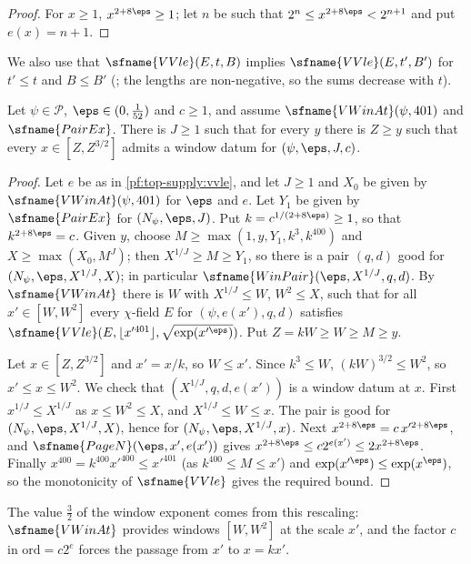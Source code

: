\begin{proof}
For $x\ge1$, $x^{2+8\eps}\ge1$; let $n$ be such that $2^n\le x^{2+8\eps}<2^{n+1}$ and put $e(x)=n+1$.
\end{proof}

We also use that $\sfname{VVle}(E,t,B)$ implies $\sfname{VVle}(E,t',B')$ for $t'\le t$ and $B\le B'$
(; the lengths are non-negative, so the sums decrease with $t$).

\begin{proposition}\label{pf:top-supply:winpairs}
Let $\psi\in\mathcal P$, $\eps\in(0,\frac1{52})$ and $c\ge1$, and assume $\sfname{VWinAt}(\psi,401)$ and $\sfname{PairEx}$.
There is $J\ge1$ such that for every $y$ there is $Z\ge y$ such that every $x\in[Z,Z^{3/2}]$ admits a window datum for
$(\psi,\eps,J,c)$. 
\end{proposition}

\begin{proof}
Let $e$ be as in \cref{pf:top-supply:vvle}, and let $J\ge1$ and $X_0$ be given by $\sfname{VWinAt}(\psi,401)$ for $\eps$
and $e$. Let $Y_1$ be given by $\sfname{PairEx}$ for $(N_\psi,\eps,J)$. Put $k=c^{1/(2+8\eps)}\ge1$, so that
$k^{2+8\eps}=c$. Given $y$, choose $M\ge\max(1,y,Y_1,k^3,k^{400})$ and $X\ge\max(X_0,M^J)$; then $X^{1/J}\ge M\ge Y_1$, so
there is a pair $(q,d)$ good for $(N_\psi,\eps,X^{1/J},X)$; in particular $\sfname{WinPair}(\eps,X^{1/J},q,d)$. By
$\sfname{VWinAt}$ there is $W$ with $X^{1/J}\le W$, $W^2\le X$, such that for all $x'\in[W,W^2]$ every $\chi$-field $E$ for
$(\psi,e(x'),q,d)$ satisfies $\sfname{VVle}(E,\lfloor x'^{401}\rfloor,\sqrt{\exp(x'^\eps)})$. Put $Z=kW\ge W\ge M\ge y$.

Let $x\in[Z,Z^{3/2}]$ and $x'=x/k$, so $W\le x'$. Since $k^3\le W$, $(kW)^{3/2}\le W^2$, so $x'\le x\le W^2$. We check
that $(X^{1/J},q,d,e(x'))$ is a window datum at $x$. First $x^{1/J}\le X^{1/J}$ as $x\le W^2\le X$, and $X^{1/J}\le W\le x$.
The pair is good for $(N_\psi,\eps,X^{1/J},X)$, hence for $(N_\psi,\eps,X^{1/J},x)$. Next
$x^{2+8\eps}=c\,x'^{2+8\eps}$, and $\sfname{PageN}(\eps,x',e(x'))$ gives $x^{2+8\eps}\le c2^{e(x')}\le2x^{2+8\eps}$. Finally
$x^{400}=k^{400}x'^{400}\le x'^{401}$ (as $k^{400}\le M\le x'$) and $\exp(x'^\eps)\le\exp(x^\eps)$, so the
monotonicity of $\sfname{VVle}$ gives the required bound.
\end{proof}

The value $\frac32$ of the window exponent comes from this rescaling: $\sfname{VWinAt}$ provides windows $[W,W^2]$ at the
scale $x'$, and the factor $c$ in $\mathrm{ord}=c2^e$ forces the passage from $x'$ to $x=kx'$.

